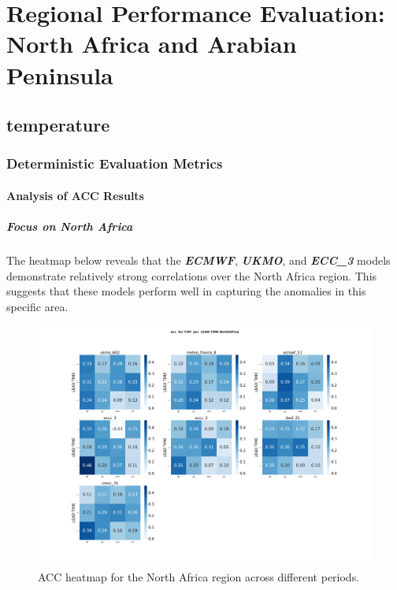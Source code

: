 

\chapter{Regional Performance Evaluation: North Africa and Arabian Peninsula}
\section{temperature}
\subsection{Deterministic Evaluation Metrics}

\subsubsection{Analysis of ACC Results}

\paragraph{Focus on North Africa}  
The heatmap below reveals that the \textbf{\textit{ECMWF}}, \textbf{\textit{UKMO}}, and \textbf{\textit{ECC\_3}} models demonstrate relatively strong correlations over the North Africa region. This suggests that these models perform well in capturing the anomalies in this specific area.  

\begin{figure}[H]
\centering
\includegraphics[scale=0.25]{plots/det/acc/acc_T2M_NorthAfrica.png}
\caption{ACC heatmap for the North Africa region across different periods.}
\end{figure}

